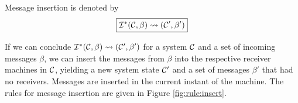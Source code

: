 
Message insertion is denoted by
\begin{equation*}
\boxed{\mathcal{I}^*(\mathcal{C}, \beta) \leadsto (\mathcal{C}', \beta')}
\end{equation*}

If we can conclude $\mathcal{I}^*(\mathcal{C}, \beta) \leadsto (\mathcal{C}', \beta')$ for a system $\mathcal{C}$ and
a set of incoming messages $\beta$, we can insert the messages from $\beta$
into the respective receiver machines in $\mathcal{C}$, yielding a new system state
$\mathcal{C}'$ and a set of messages $\beta'$ that had no receivers. Messages are
inserted in the current instant of the machine. The rules for message insertion
are given in Figure \ref{fig:rule:insert}.

\begin{figure}[!ht]
\end{figure}
